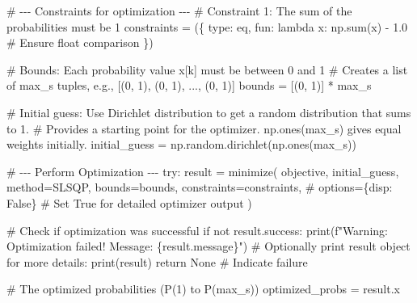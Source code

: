 \documentclass[
  letterpaper,
  DIV=11,
  numbers=noendperiod]{scrartcl}
\newenvironment{Shaded}{\begin{snugshade}}{\end{snugshade}}
\newcommand{\BuiltInTok}[1]{\textcolor[rgb]{0.00,0.23,0.31}{#1}}
\newcommand{\CommentTok}[1]{\textcolor[rgb]{0.37,0.37,0.37}{#1}}
\newcommand{\ControlFlowTok}[1]{\textcolor[rgb]{0.00,0.23,0.31}{#1}}
\newcommand{\DecValTok}[1]{\textcolor[rgb]{0.68,0.00,0.00}{#1}}
\newcommand{\FloatTok}[1]{\textcolor[rgb]{0.68,0.00,0.00}{#1}}
\newcommand{\KeywordTok}[1]{\textcolor[rgb]{0.00,0.23,0.31}{#1}}
\newcommand{\NormalTok}[1]{\textcolor[rgb]{0.00,0.23,0.31}{#1}}
\newcommand{\OperatorTok}[1]{\textcolor[rgb]{0.37,0.37,0.37}{#1}}
\newcommand{\SpecialCharTok}[1]{\textcolor[rgb]{0.37,0.37,0.37}{#1}}
\newcommand{\SpecialStringTok}[1]{\textcolor[rgb]{0.13,0.47,0.30}{#1}}
\newcommand{\StringTok}[1]{\textcolor[rgb]{0.13,0.47,0.30}{#1}}
\newcommand{\VariableTok}[1]{\textcolor[rgb]{0.07,0.07,0.07}{#1}}
\begin{document}
\begin{Shaded}
\begin{Highlighting}[]
    \CommentTok{\# {-}{-}{-} Constraints for optimization {-}{-}{-}}
    \CommentTok{\# Constraint 1: The sum of the probabilities must be 1}
\NormalTok{    constraints }\OperatorTok{=}\NormalTok{ (\{}
        \StringTok{\textquotesingle{}type\textquotesingle{}}\NormalTok{: }\StringTok{\textquotesingle{}eq\textquotesingle{}}\NormalTok{,}
        \StringTok{\textquotesingle{}fun\textquotesingle{}}\NormalTok{: }\KeywordTok{lambda}\NormalTok{ x: np.}\BuiltInTok{sum}\NormalTok{(x) }\OperatorTok{{-}} \FloatTok{1.0} \CommentTok{\# Ensure float comparison}
\NormalTok{    \})}

    \CommentTok{\# Bounds: Each probability value x[k] must be between 0 and 1}
    \CommentTok{\# Creates a list of max\_s tuples, e.g., [(0, 1), (0, 1), ..., (0, 1)]}
\NormalTok{    bounds }\OperatorTok{=}\NormalTok{ [(}\DecValTok{0}\NormalTok{, }\DecValTok{1}\NormalTok{)] }\OperatorTok{*}\NormalTok{ max\_s}

    \CommentTok{\# Initial guess: Use Dirichlet distribution to get a random distribution that sums to 1.}
    \CommentTok{\# Provides a starting point for the optimizer. np.ones(max\_s) gives equal weights initially.}
\NormalTok{    initial\_guess }\OperatorTok{=}\NormalTok{ np.random.dirichlet(np.ones(max\_s))}

    \CommentTok{\# {-}{-}{-} Perform Optimization {-}{-}{-}}
    \ControlFlowTok{try}\NormalTok{:}
\NormalTok{        result }\OperatorTok{=}\NormalTok{ minimize(}
\NormalTok{            objective,}
\NormalTok{            initial\_guess,}
\NormalTok{            method}\OperatorTok{=}\StringTok{\textquotesingle{}SLSQP\textquotesingle{}}\NormalTok{,}
\NormalTok{            bounds}\OperatorTok{=}\NormalTok{bounds,}
\NormalTok{            constraints}\OperatorTok{=}\NormalTok{constraints,}
            \CommentTok{\# options=\{\textquotesingle{}disp\textquotesingle{}: False\} \# Set True for detailed optimizer output}
\NormalTok{        )}

        \CommentTok{\# Check if optimization was successful}
        \ControlFlowTok{if} \KeywordTok{not}\NormalTok{ result.success:}
            \BuiltInTok{print}\NormalTok{(}\SpecialStringTok{f"Warning: Optimization failed! Message: }\SpecialCharTok{\{}\NormalTok{result}\SpecialCharTok{.}\NormalTok{message}\SpecialCharTok{\}}\SpecialStringTok{"}\NormalTok{)}
            \CommentTok{\# Optionally print result object for more details: print(result)}
            \ControlFlowTok{return} \VariableTok{None} \CommentTok{\# Indicate failure}

        \CommentTok{\# The optimized probabilities (P(1) to P(max\_s))}
\NormalTok{        optimized\_probs }\OperatorTok{=}\NormalTok{ result.x}


\end{Highlighting}
\end{Shaded}
\end{document}
